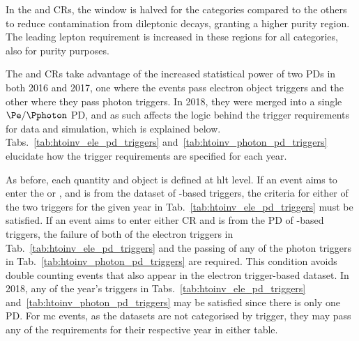 In the \doubleMuCr and \doubleEleCr \glspl{CR}, the \doubleLepMass window is halved for the \ttH categories compared to the others to reduce contamination from dileptonic \ttbar decays, granting a higher purity \ztolplmpjets region. The leading lepton \pt requirement is increased in these regions for all categories, also for purity purposes.

The \singleEleCr and \doubleEleCr \glspl{CR} take advantage of the increased statistical power of two \glspl{PD} in both 2016 and 2017, one where the events pass electron object triggers and the other where they pass photon triggers. In 2018, they were merged into a single $\Pe/\Pphoton$ \gls{PD}, and as such affects the logic behind the trigger requirements for data and simulation, which is explained below. Tabs.~\ref{tab:htoinv_ele_pd_triggers} and~\ref{tab:htoinv_photon_pd_triggers} elucidate how the trigger requirements are specified for each year.

As before, each quantity and object is defined at \acrshort{hlt} level. If an event aims to enter the \singleEleCr or \doubleEleCr, and is from the dataset of \Pe-based triggers, the criteria for either of the two triggers for the given year in Tab.~\ref{tab:htoinv_ele_pd_triggers} must be satisfied. If an event aims to enter either \gls{CR} and is from the \gls{PD} of \Pphoton-based triggers, the failure of both of the electron triggers in Tab.~\ref{tab:htoinv_ele_pd_triggers} and the passing of any of the photon triggers in Tab.~\ref{tab:htoinv_photon_pd_triggers} are required. This condition avoids double counting events that also appear in the electron trigger-based dataset. In 2018, any of the year's triggers in Tabs.~\ref{tab:htoinv_ele_pd_triggers} and~\ref{tab:htoinv_photon_pd_triggers} may be satisfied since there is only one \gls{PD}. For \acrlong{mc} events, as the datasets are not categorised by trigger, they may pass any of the requirements for their respective year in either table.

